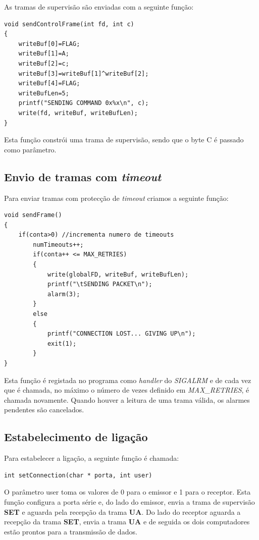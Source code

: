 \documentclass[a4paper,11pt]{article}
\begin{document}
As tramas de supervisão são enviadas com a seguinte função:\\

\lstset{language=C,
		showstringspaces=false,
		caption=,
		frame=}
		
\begin{lstlisting}
void sendControlFrame(int fd, int c)
{
    writeBuf[0]=FLAG;
    writeBuf[1]=A;
    writeBuf[2]=c;
    writeBuf[3]=writeBuf[1]^writeBuf[2];
    writeBuf[4]=FLAG;
    writeBufLen=5;
    printf("SENDING COMMAND 0x%x\n", c);
    write(fd, writeBuf, writeBufLen);  
}
\end{lstlisting}
Esta função constrói uma trama de supervisão, sendo que o byte C é passado como parâmetro.
\pagebreak
\subsection{Envio de tramas com \textit{timeout}}

Para enviar tramas com protecção de \textit{timeout} criamos a seguinte função:

\begin{lstlisting}
void sendFrame()
{
    if(conta>0) //incrementa numero de timeouts
        numTimeouts++;
        if(conta++ <= MAX_RETRIES)
        {
            write(globalFD, writeBuf, writeBufLen);
            printf("\tSENDING PACKET\n");
            alarm(3);
        }
        else
        {
            printf("CONNECTION LOST... GIVING UP\n");
            exit(1);
        }
}
\end{lstlisting}

Esta função é registada no programa como \textit{handler} do \textit{SIGALRM} e de cada vez que é chamada, no máximo o número de vezes definido em \textit{MAX\_RETRIES}, é chamada novamente.
Quando houver a leitura de uma trama válida, os alarmes pendentes são cancelados.

\subsection{Estabelecimento de ligação}

Para estabelecer a ligação, a seguinte função é chamada:\\
		
\begin{lstlisting}
int setConnection(char * porta, int user)
\end{lstlisting}

O parâmetro user toma os valores de 0 para o emissor e 1 para o receptor.
Esta função configura a porta série e, do lado do emissor, envia a trama de supervisão \textbf{SET} e aguarda pela recepção da trama \textbf{UA}.
Do lado do receptor aguarda a recepção da trama \textbf{SET}, envia a trama \textbf{UA} e de seguida os dois computadores estão prontos para a transmissão de dados.
\end{document}
